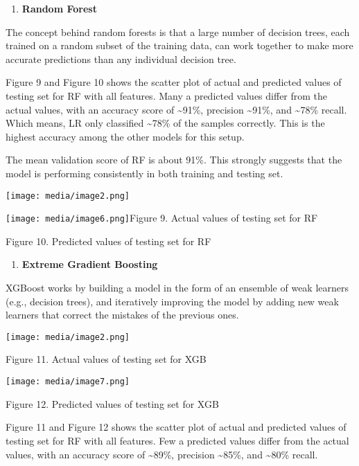 \documentclass[
]{article}
\begin{document}
\begin{enumerate}
\def\labelenumi{\alph{enumi})}
\setcounter{enumi}{3}
\item
  \textbf{Random Forest}
\end{enumerate}

The concept behind random forests is that a large number of decision
trees, each trained on a random subset of the training data, can work
together to make more accurate predictions than any individual decision
tree.

Figure 9 and Figure 10 shows the scatter plot of actual and predicted
values of testing set for RF with all features. Many a predicted values
differ from the actual values, with an accuracy score of
\textasciitilde91\%, precision \textasciitilde91\%, and
\textasciitilde78\% recall. Which means, LR only classified
\textasciitilde78\% of the samples correctly. This is the highest
accuracy among the other models for this setup.

The mean validation score of RF is about 91\%. This strongly suggests
that the model is performing consistently in both training and testing
set.

\texttt{[image: media/image2.png]}

\texttt{[image: media/image6.png]}Figure
9. Actual values of testing set for RF

Figure 10. Predicted values of testing set for RF

\begin{enumerate}
\def\labelenumi{\alph{enumi})}
\setcounter{enumi}{4}
\item
  \textbf{Extreme Gradient Boosting}
\end{enumerate}

XGBoost works by building a model in the form of an ensemble of weak
learners (e.g., decision trees), and iteratively improving the model by
adding new weak learners that correct the mistakes of the previous ones.

\texttt{[image: media/image2.png]}

Figure 11. Actual values of testing set for XGB

\texttt{[image: media/image7.png]}

Figure 12. Predicted values of testing set for XGB

Figure 11 and Figure 12 shows the scatter plot of actual and predicted
values of testing set for RF with all features. Few a predicted values
differ from the actual values, with an accuracy score of
\textasciitilde89\%, precision \textasciitilde85\%, and
\textasciitilde80\% recall.
\end{document}
